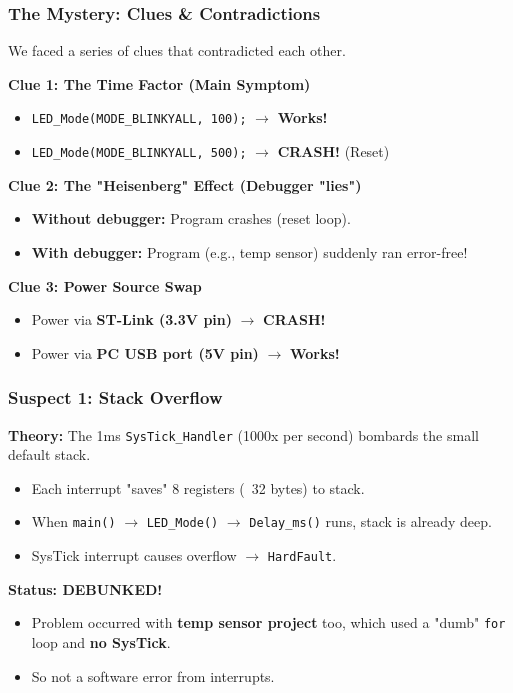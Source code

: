 \documentclass{beamer}
\begin{document}
\begin{frame}
	\frametitle{The Mystery: Clues \& Contradictions}
	We faced a series of clues that contradicted each other.
	
	\medskip
	\textbf{Clue 1: The Time Factor (Main Symptom)}
	\begin{itemize}
		\item \texttt{LED\_Mode(MODE\_BLINKYALL, 100);} $\rightarrow$ \textbf{Works!}
		\item \texttt{LED\_Mode(MODE\_BLINKYALL, 500);} $\rightarrow$ \textbf{CRASH!} (Reset)
	\end{itemize}
	
	\medskip
	\textbf{Clue 2: The "Heisenberg" Effect (Debugger "lies")}
	\begin{itemize}
		\item \textbf{Without debugger:} Program crashes (reset loop).
		\item \textbf{With debugger:} Program (e.g., temp sensor) suddenly ran error-free!
	\end{itemize}
	
	\medskip
	\textbf{Clue 3: Power Source Swap}
	\begin{itemize}
		\item Power via \textbf{ST-Link (3.3V pin)} $\rightarrow$ \textbf{CRASH!}
		\item Power via \textbf{PC USB port (5V pin)} $\rightarrow$ \textbf{Works!}
	\end{itemize}
\end{frame}

\begin{frame}
	\frametitle{Suspect 1: Stack Overflow}
	\textbf{Theory:} The 1ms \texttt{SysTick\_Handler} (1000x per second)
	bombards the small default stack.
	\begin{itemize}
		\item Each interrupt "saves" 8 registers (~32 bytes) to stack.
		\item When \texttt{main()} $\rightarrow$ \texttt{LED\_Mode()} $\rightarrow$ \texttt{Delay\_ms()} runs,
		stack is already deep.
		\item SysTick interrupt causes overflow $\rightarrow$ \texttt{HardFault}.
	\end{itemize}
	
	\bigskip
	\textbf{Status: DEBUNKED!}
	\begin{itemize}
		\item Problem occurred with \textbf{temp sensor project} too, which
		used a "dumb" \texttt{for} loop and \textbf{no SysTick}.
		\item So not a software error from interrupts.
	\end{itemize}
\end{frame}
\end{document}
